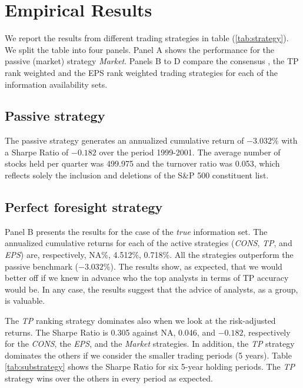 \documentclass{article}\usepackage[]{graphicx}\usepackage[]{color}
\newcommand{\tr}{\textit{true}}
\begin{document}

\section{Empirical Results}
\label{sec:results}

We report the results from different trading strategies in table (\ref{tab:strategy}). We split the table into four panels. Panel A shows  the performance for  the passive (market) strategy \textit{Market}. Panels B to D compare the consensus , the TP rank weighted and the EPS rank weighted trading strategies for each of the information availability sets. 


\subsection{Passive strategy}

The passive strategy generates an annualized cumulative return of \ensuremath{-3.032}\% with a Sharpe Ratio  of \ensuremath{-0.182} over the period 1999-2001. The average number of stocks held per quarter was 499.975 and the turnover ratio was 0.053, which reflects solely the inclusion and deletions  of the S\&P 500 constituent list.

\subsection{Perfect foresight strategy}
\label{sec:perfect}
Panel B presents the results for the case of the \tr{} information set. The annualized cumulative returns for each of the active strategies (\textit{CONS}, \textit{TP}, and \textit{EPS}) are, respectively, NA\%, 4.512\%, 0.718\%. All the strategies outperform the passive benchmark (\ensuremath{-3.032}\%). The results show, as expected, that  we would better off if we knew in advance who the top analysts in terms of TP accuracy would be. In any case, the results suggest that the advice of analysts, as a group, is valuable. 


The \textit{TP} ranking strategy dominates also when we look at the risk-adjusted returns. The Sharpe Ratio is 0.305 against NA, 0.046, and \ensuremath{-0.182}, respectively for the \textit{CONS}, the \textit{EPS}, and the \textit{Market} strategies. In addition, the \textit{TP} strategy dominates  the others if we consider the smaller trading periods (5 years). Table \ref{tab:substrategy} shows the Sharpe Ratio for six 5-year holding periods. The \textit{TP} strategy wins over the others in every period as expected.
\end{document}
